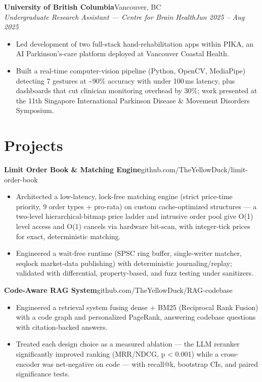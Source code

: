 \documentclass[letterpaper,11pt]{article}
\newcommand{\entry}[4]{%
  \textbf{#1}\hfill{\small #2}\\[1pt]%
  {\small\itshape #3}\hfill{\small\itshape #4}\par%
}
\newcommand{\project}[3]{%
  \textbf{#1}\enspace{\small\textcolor{accent!55}{\textbar}\enspace #2}\hfill{\small #3}\par%
}
\newenvironment{bullets}
  {\begin{itemize}[leftmargin=1.5em,labelsep=0.5em,itemsep=1pt,topsep=1pt,parsep=0pt,partopsep=0pt]\small}
  {\end{itemize}\vspace{1pt}}
\begin{document}
\entry{University of British Columbia}{Vancouver, BC}{Undergraduate Research Assistant --- Centre for Brain Health}{Jun 2025 -- Aug 2025}
\begin{bullets}
  \item Led development of two full-stack hand-rehabilitation apps within PIKA, an AI Parkinson's-care platform deployed at Vancouver Coastal Health.
  \item Built a real-time computer-vision pipeline (Python, OpenCV, MediaPipe) detecting 7 gestures at \textasciitilde90\% accuracy with under 100\,ms latency, plus dashboards that cut clinician monitoring overhead by 30\%; work presented at the 11th Singapore International Parkinson Disease \& Movement Disorders Symposium.
\end{bullets}

\section{Projects}

\project{Limit Order Book \& Matching Engine}{C++20}{github.com/TheYellowDuck/limit-order-book}
\begin{bullets}
  \item Architected a low-latency, lock-free matching engine (strict price-time priority, 9 order types + pro-rata) on custom cache-optimized structures --- a two-level hierarchical-bitmap price ladder and intrusive order pool give O(1) level access and O(1) cancels via hardware bit-scan, with integer-tick prices for exact, deterministic matching.
  \item Engineered a wait-free runtime (SPSC ring buffer, single-writer matcher, seqlock market-data publishing) with deterministic journaling/replay; validated with differential, property-based, and fuzz testing under sanitizers.
\end{bullets}

\project{Code-Aware RAG System}{Python, tree-sitter, embeddings}{github.com/TheYellowDuck/RAG-codebase}
\begin{bullets}
  \item Engineered a retrieval system fusing dense + BM25 (Reciprocal Rank Fusion) with a code graph and personalized PageRank, answering codebase questions with citation-backed answers.
  \item Treated each design choice as a measured ablation --- the LLM reranker significantly improved ranking (MRR/NDCG, p \textless{} 0.001) while a cross-encoder was net-negative on code --- with recall@k, bootstrap CIs, and paired significance tests.
\end{bullets}
\end{document}
